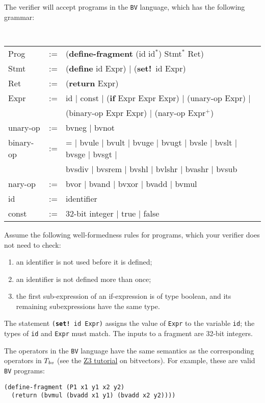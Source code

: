 \documentclass{handout}
\begin{document}
The verifier will accept programs in the \texttt{BV} language, which has the
following grammar:

{\tt\small
\begin{tabular}{lcl}
Prog &:=&  (\textbf{define-fragment} (id id$^\mathtt{*}$) Stmt$^\mathtt{*}$ Ret) \\
Stmt &:=& (\textbf{define} id Expr) $|$ (\textbf{set!}\ id Expr) \\
Ret &:=& (\textbf{return} Expr) \\
Expr &:=& id $|$ const $|$ (\textbf{if} Expr Expr Expr) $|$ (unary-op Expr) $|$ \\
         &&(binary-op Expr Expr) $|$ (nary-op Expr$^\mathtt{+}$)\\
unary-op &:=& bvneg $|$ bvnot \\
binary-op &:=& = $|$ bvule $|$ bvult $|$ bvuge $|$ bvugt $|$ bvsle $|$ bvslt  $|$ bvsge $|$ bvsgt $|$  \\
                && bvsdiv $|$ bvsrem $|$ bvshl $|$ bvlshr $|$ bvashr $|$ bvsub\\
nary-op &:=& bvor $|$ bvand $|$ bvxor $|$  bvadd $|$  bvmul\\
id &:=& identifier\\
const &:=& 32-bit integer $|$ true $|$ false\\
\end{tabular}}

Assume the following well-formedness rules for programs, which your verifier
does not need to check:
\begin{enumerate}
\item an identifier is not used before it is defined;
\item an identifier is not defined more than once;
\item the first sub-expression of an if-expression is of type boolean, and its remaining subexpressions have the same type.
\end{enumerate}
The statement \texttt{(\textbf{set!}\ id Expr)}  assigns the value of
\texttt{Expr} to the variable \texttt{id}; the types of \texttt{id} and
\texttt{Expr} must match.  The inputs to a fragment are 32-bit integers.

The operators in the \texttt{BV} language have the same semantics as the
corresponding operators in $T_\emph{bv}$ (see the
\href{http://rise4fun.com/z3/tutorial}{Z3 tutorial} on bitvectors). For example,
these are valid \texttt{BV} programs:

\lstset{language=lisp}
\begin{lstlisting}
(define-fragment (P1 x1 y1 x2 y2)
  (return (bvmul (bvadd x1 y1) (bvadd x2 y2))))
\end{lstlisting}
\end{document}

